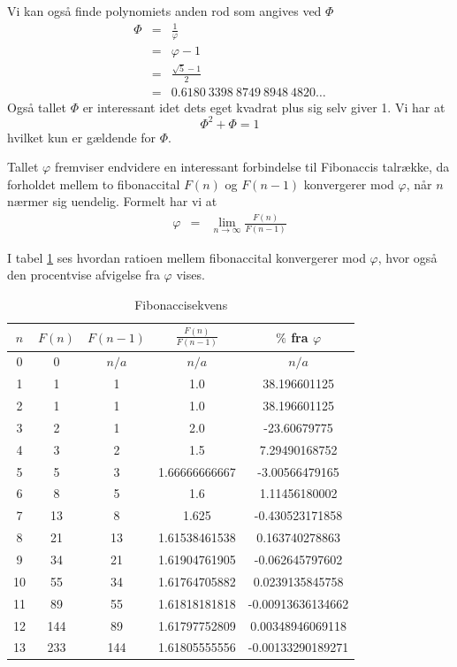 {Vi kan også finde polynomiets anden rod som angives ved $\varPhi$
\begin{eqnarray}
	\varPhi & = & \frac{1}{\varphi} \\
		& = & \varphi - 1 \\
        & = & \frac{\sqrt{5} - 1}{2} \\
		& = & 0.6180\ 3398\ 8749\ 8948\ 4820 \dots
		\label{mange_tal}
\end{eqnarray}
Også tallet $\varPhi$ er interessant idet dets eget kvadrat plus sig
selv giver 1. Vi har at
\begin{equation}
	\varPhi^{2} + \varPhi = 1
	\label{Phi_squared}
\end{equation}
hvilket kun er gældende for $\varPhi$.

Tallet $\varphi$ fremviser endvidere en interessant forbindelse til
Fibonaccis talrække, da forholdet mellem to fibonaccital $F(n)$ og $F(n
- 1)$ konvergerer mod $\varphi$, når $n$ nærmer sig uendelig. Formelt har
vi at
\begin{eqnarray*}
	\varphi & =     & \lim_{n \rightarrow\infty}{\frac{F(n)}{F(n - 1)}}
\end{eqnarray*}

I tabel \ref{fibonacci_sequence} ses hvordan ratioen mellem fibonaccital
konvergerer mod $\varphi$, hvor også den procentvise afvigelse fra
$\varphi$ vises.

\begin{table}[h!]
    \centering
    \begin{tabular}{|c|c|c|c|c|}
        \hline
        $n$ & $F(n)$ & $F(n - 1)$ & $ \frac{F(n)}{F(n - 1)}$ & $\%$ fra $\varphi$ \\
        \hline
        0	 & 0 	 & $n/a$ & $n/a$ 		& $n/a$ 		\\
        1	 & 1	 & 1	 & 1.0		 	& 38.196601125 		\\
        2	 & 1	 & 1	 & 1.0		 	& 38.196601125 		\\
        3	 & 2	 & 1	 & 2.0		 	& -23.60679775 		\\
        4	 & 3	 & 2	 & 1.5			& 7.29490168752 	\\
        5	 & 5	 & 3	 & 1.66666666667	& -3.00566479165 	\\
        6	 & 8	 & 5	 & 1.6			& 1.11456180002 	\\
        7	 & 13	 & 8	 & 1.625	 	& -0.430523171858 	\\
        8	 & 21	 & 13	 & 1.61538461538	& 0.163740278863 	\\
        9	 & 34	 & 21	 & 1.61904761905	& -0.062645797602 	\\
        10	 & 55	 & 34	 & 1.61764705882	& 0.0239135845758 	\\
        11	 & 89	 & 55	 & 1.61818181818	& -0.00913636134662 	\\
        12	 & 144	 & 89	 & 1.61797752809	& 0.00348946069118 	\\
        13	 & 233	 & 144	 & 1.61805555556	& -0.00133290189271 	\\
        \hline
    \end{tabular}
    \caption{Fibonaccisekvens}
    \label{fibonacci_sequence}
\end{table}

}
